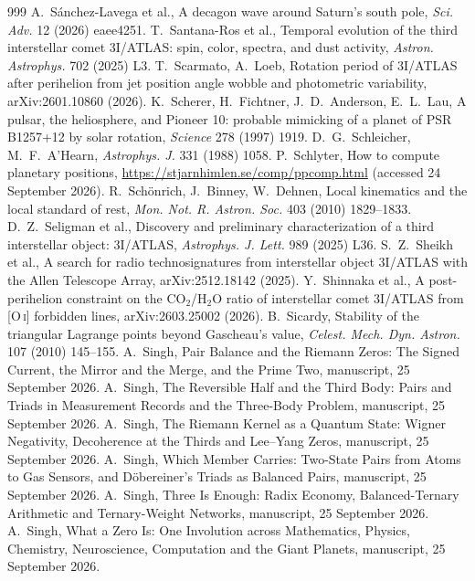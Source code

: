 \documentclass[11pt]{article}
\theoremstyle{definition}\newtheorem{definition}[theorem]{Definition}
\theoremstyle{remark}\newtheorem{remark}[theorem]{Remark}
\begin{document}
\begin{thebibliography}{999}
 A.~S\'anchez-Lavega et al., A decagon wave around Saturn's south pole, \emph{Sci. Adv.} 12 (2026) eaee4251.
 T.~Santana-Ros et al., Temporal evolution of the third interstellar comet 3I/ATLAS: spin, color, spectra, and dust activity, \emph{Astron. Astrophys.} 702 (2025) L3.
 T.~Scarmato, A.~Loeb, Rotation period of 3I/ATLAS after perihelion from jet position angle wobble and photometric variability, arXiv:2601.10860 (2026).
 K.~Scherer, H.~Fichtner, J.~D.~Anderson, E.~L.~Lau, A pulsar, the heliosphere, and Pioneer 10: probable mimicking of a planet of PSR B1257+12 by solar rotation, \emph{Science} 278 (1997) 1919.
 D.~G.~Schleicher, M.~F.~A'Hearn, \emph{Astrophys. J.} 331 (1988) 1058.
 P.~Schlyter, How to compute planetary positions, \url{https://stjarnhimlen.se/comp/ppcomp.html} (accessed 24 September 2026).
 R.~Sch\"onrich, J.~Binney, W.~Dehnen, Local kinematics and the local standard of rest, \emph{Mon. Not. R. Astron. Soc.} 403 (2010) 1829--1833.
 D.~Z.~Seligman et al., Discovery and preliminary characterization of a third interstellar object: 3I/ATLAS, \emph{Astrophys. J. Lett.} 989 (2025) L36.
 S.~Z.~Sheikh et al., A search for radio technosignatures from interstellar object 3I/ATLAS with the Allen Telescope Array, arXiv:2512.18142 (2025).
 Y.~Shinnaka et al., A post-perihelion constraint on the CO$_2$/H$_2$O ratio of interstellar comet 3I/ATLAS from [O\,\textsc{i}] forbidden lines, arXiv:2603.25002 (2026).
 B.~Sicardy, Stability of the triangular Lagrange points beyond Gascheau's value, \emph{Celest. Mech. Dyn. Astron.} 107 (2010) 145--155.
 A.~Singh, Pair Balance and the Riemann Zeros: The Signed Current, the Mirror and the Merge, and the Prime Two, manuscript, 25 September 2026.
 A.~Singh, The Reversible Half and the Third Body: Pairs and Triads in Measurement Records and the Three-Body Problem, manuscript, 25 September 2026.
 A.~Singh, The Riemann Kernel as a Quantum State: Wigner Negativity, Decoherence at the Thirds and Lee--Yang Zeros, manuscript, 25 September 2026.
 A.~Singh, Which Member Carries: Two-State Pairs from Atoms to Gas Sensors, and D\"obereiner's Triads as Balanced Pairs, manuscript, 25 September 2026.
 A.~Singh, Three Is Enough: Radix Economy, Balanced-Ternary Arithmetic and Ternary-Weight Networks, manuscript, 25 September 2026.
 A.~Singh, What a Zero Is: One Involution across Mathematics, Physics, Chemistry, Neuroscience, Computation and the Giant Planets, manuscript, 25 September 2026.

\end{thebibliography}
\end{document}
